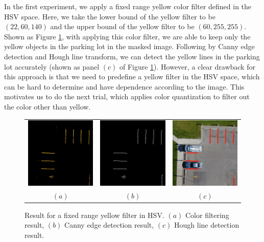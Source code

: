 \documentclass{m2pi}
\begin{document}
In the first experiment, we apply a fixed range yellow color filter defined 
in the HSV  space. 
Here, we take the lower bound of the yellow filter  to be
$(22, 60, 140)$ and the upper bound of the yellow filter  to be 
$(60,255,255)$. Shown as Figure \ref{lot1hsv}, with applying this color filter, 
we are able to keep only the yellow objects in the parking lot in the masked image. 
Following by Canny edge detection and Hough line transform, we can detect 
the yellow lines in the parking lot accurately (shown as panel $(c)$ of 
Figure \ref{lot1hsv}). However, a 
clear drawback for this approach is that we need to predefine 
a yellow filter in the HSV space, which can be hard to determine and have 
dependence according to the image. This motivates us to do the next 
trial, which applies color quantization to filter out the color 
other than yellow.

\begin{figure}[htp]
\centering
\begin{tabular}{ccc}
\includegraphics[width=3.8cm]{figures/Lot1mask.jpg}&
\includegraphics[width=3.8cm]{figures/Lot1edge.jpg}&
\includegraphics[width=3.8cm]{figures/Lot1detected.jpg}\\
$(a)$ & $(b)$ & $(c)$
\end{tabular}
\caption{Result for a fixed range yellow filter in HSV.
$(a)$ Color filtering result, 
$(b)$ Canny edge detection result,
$(c)$ Hough line detection result.}
\label{lot1hsv}
\end{figure}
\end{document}
